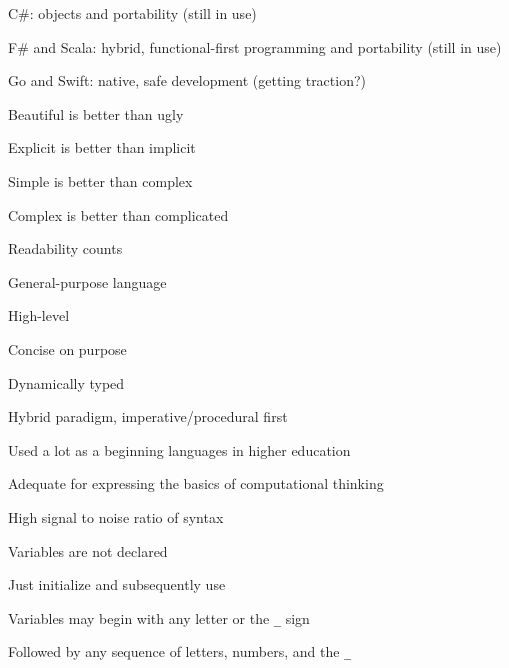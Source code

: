 \documentclass{beamer}
\begin{document}
\begin{slide}{
\item C\#: objects and portability (still in use)
\item F\# and Scala: hybrid, functional-first programming and portability (still in use)
\item Go and Swift: native, safe development (getting traction?)
}\end{slide}


\begin{slide}{
\item Beautiful is better than ugly
\item Explicit is better than implicit
\item Simple is better than complex
\item Complex is better than complicated
\item Readability counts
}\end{slide}

\begin{slide}{
\item General-purpose language
\item High-level
\item Concise on purpose
\item Dynamically typed
\item Hybrid paradigm, imperative/procedural first
}\end{slide}

\begin{slide}{
\item Used a lot as a beginning languages in higher education
\item Adequate for expressing the basics of computational thinking
\item High signal to noise ratio of syntax
}\end{slide}

\begin{slide}{
\item Variables are not declared
\item Just initialize and subsequently use
}\end{slide}

\begin{slide}{
\item Variables may begin with any letter or the \texttt{\_} sign
\item Followed by any sequence of letters, numbers, and the \texttt{\_}
}\end{slide}
\end{document}

